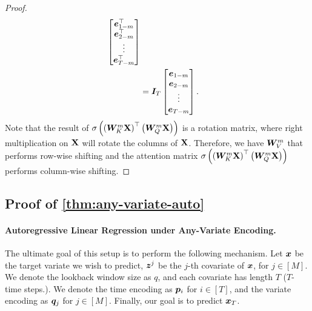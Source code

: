 \begin{proof}
\begin{align*}
        \begin{bmatrix}
            \bm{e}_{1-m}^\top
            \\
            \bm{e}_{2-m}^\top
            \\
            \vdots
            \\
            \bm{e}_{T-m}^\top
        \end{bmatrix}
        \\
        &=
        \bm{I}_T
        \begin{bmatrix}
            \bm{e}_{1-m}
            \\
            \bm{e}_{2-m}
            \\
            \vdots
            \\
            \bm{e}_{T-m}
        \end{bmatrix}.
    \end{align*}
    Note that the result of 
        $\sigma\left(\left(
        \bm{W}_K^m
        \mathbf{X}
        \right)^\top
        \left(
        \bm{W}_Q^m
        \mathbf{X}
        \right)
        \right)$
    is a rotation matrix, where right multiplication on $\mathbf{X}$ will rotate the columns of $\mathbf{X}$.
    Therefore, we have 
    $\bm{W}_V^m$ that performs row-wise shifting and the attention matrix 
    $\sigma\left(\left(
        \bm{W}_K^m
        \mathbf{X}
        \right)^\top
        \left(
        \bm{W}_Q^m
        \mathbf{X}
        \right)
        \right)$
        performs column-wise shifting.
\end{proof}


\subsection{Proof of \cref{thm:any-variate-auto}}\label{proof:any-var-enc}

\paragraph{Autoregressive Linear Regression under Any-Variate Encoding.}
The ultimate goal of this setup is to perform the following mechanism.
Let $\bm{x}$ be the target variate we wish to predict, $\bm{z}^j$ be the $j$-th covariate of $\bm{x}$, for $j \in [M]$.
We denote the lookback window size as $q$, and each covariate has length $T$ ($T$-time steps.).
We denote the time encoding as $\bm{p}_i$ for $i \in [T]$, and the variate encoding as $\bm{q}_{j}$ for $j \in [M]$.
Finally, our goal is to predict $\bm{x}_T$.

